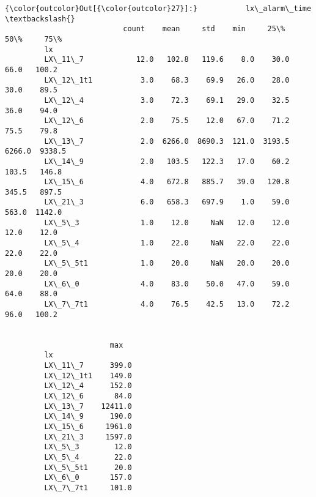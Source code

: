 \documentclass[11pt]{article}
\begin{document}
\begin{Verbatim}[commandchars=\\\{\}]
{\color{outcolor}Out[{\color{outcolor}27}]:}           lx\_alarm\_time                                                 \textbackslash{}
                           count    mean     std    min     25\%     50\%     75\%   
         lx                                                                       
         LX\_11\_7            12.0   102.8   119.6    8.0    30.0    66.0   100.2   
         LX\_12\_1t1           3.0    68.3    69.9   26.0    28.0    30.0    89.5   
         LX\_12\_4             3.0    72.3    69.1   29.0    32.5    36.0    94.0   
         LX\_12\_6             2.0    75.5    12.0   67.0    71.2    75.5    79.8   
         LX\_13\_7             2.0  6266.0  8690.3  121.0  3193.5  6266.0  9338.5   
         LX\_14\_9             2.0   103.5   122.3   17.0    60.2   103.5   146.8   
         LX\_15\_6             4.0   672.8   885.7   39.0   120.8   345.5   897.5   
         LX\_21\_3             6.0   658.3   697.9    1.0    59.0   563.0  1142.0   
         LX\_5\_3              1.0    12.0     NaN   12.0    12.0    12.0    12.0   
         LX\_5\_4              1.0    22.0     NaN   22.0    22.0    22.0    22.0   
         LX\_5\_5t1            1.0    20.0     NaN   20.0    20.0    20.0    20.0   
         LX\_6\_0              4.0    83.0    50.0   47.0    59.0    64.0    88.0   
         LX\_7\_7t1            4.0    76.5    42.5   13.0    72.2    96.0   100.2   
         
                             
                        max  
         lx                  
         LX\_11\_7      399.0  
         LX\_12\_1t1    149.0  
         LX\_12\_4      152.0  
         LX\_12\_6       84.0  
         LX\_13\_7    12411.0  
         LX\_14\_9      190.0  
         LX\_15\_6     1961.0  
         LX\_21\_3     1597.0  
         LX\_5\_3        12.0  
         LX\_5\_4        22.0  
         LX\_5\_5t1      20.0  
         LX\_6\_0       157.0  
         LX\_7\_7t1     101.0  
\end{Verbatim}
            

    
    
    
    
\end{document}
